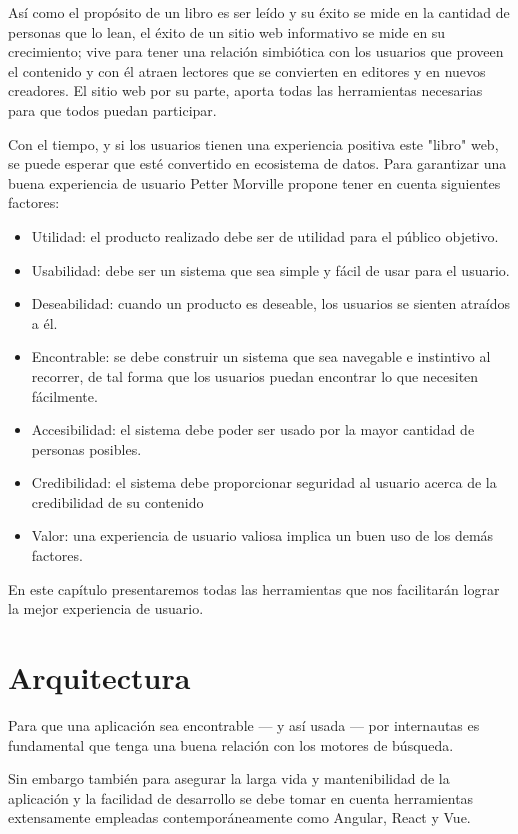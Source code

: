 Así como el propósito de un libro es ser leído y su éxito se mide en la cantidad de personas que lo lean, el éxito de un sitio web informativo se mide en su crecimiento; vive para tener una relación simbiótica con los usuarios que proveen el contenido y con él atraen lectores que se convierten en editores y en nuevos creadores. El sitio web por su parte, aporta todas las herramientas necesarias para que todos puedan participar.

Con el tiempo, y si los usuarios tienen una experiencia positiva este "libro" web, se puede esperar que esté convertido en ecosistema de datos. Para garantizar una buena experiencia de usuario Petter Morville \cite{UXFactors} propone tener en cuenta siguientes factores:

\begin{itemize}
  \item Utilidad: el producto realizado debe ser de utilidad para el público objetivo.
  \item Usabilidad: debe ser un sistema que sea simple y fácil de usar para el usuario.
  \item Deseabilidad: cuando un producto es deseable, los usuarios se sienten atraídos a él.
  \item Encontrable: se debe construir un sistema que sea navegable e instintivo al recorrer, de tal forma que los usuarios puedan encontrar lo que necesiten fácilmente.
  \item Accesibilidad: el sistema debe poder ser usado por la mayor cantidad de personas posibles.
  \item Credibilidad: el sistema debe proporcionar seguridad al usuario acerca de la credibilidad de su contenido
  \item Valor: una experiencia de usuario valiosa implica un buen uso de los demás factores.
\end{itemize}

En este capítulo presentaremos todas las herramientas que nos facilitarán lograr la mejor experiencia de usuario.

\section{Arquitectura}

Para que una aplicación sea encontrable — y así usada — por internautas es fundamental que tenga una buena relación con los motores de búsqueda.

Sin embargo también para asegurar la larga vida y mantenibilidad de la aplicación y la facilidad de desarrollo se debe tomar en cuenta herramientas extensamente empleadas contemporáneamente como Angular, React y Vue.

